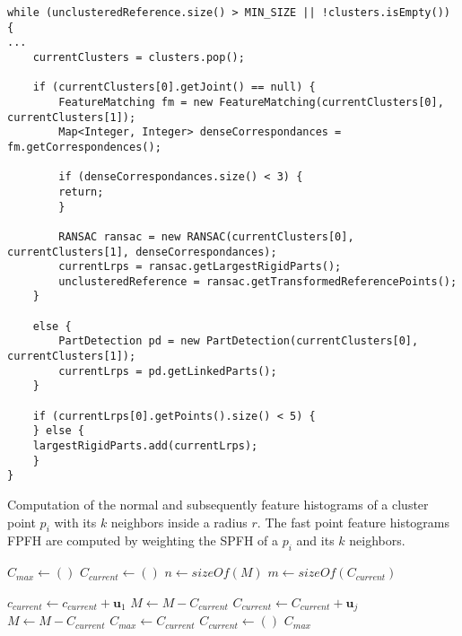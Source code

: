 \begin{lstlisting}
while (unclusteredReference.size() > MIN_SIZE || !clusters.isEmpty()) {
...
	currentClusters = clusters.pop();

	if (currentClusters[0].getJoint() == null) {
		FeatureMatching fm = new FeatureMatching(currentClusters[0], currentClusters[1]);
		Map<Integer, Integer> denseCorrespondances = fm.getCorrespondences();

		if (denseCorrespondances.size() < 3) {
		return;
		}

		RANSAC ransac = new RANSAC(currentClusters[0], currentClusters[1], denseCorrespondances);
		currentLrps = ransac.getLargestRigidParts();
		unclusteredReference = ransac.getTransformedReferencePoints();
	}

	else {
		PartDetection pd = new PartDetection(currentClusters[0], currentClusters[1]);
		currentLrps = pd.getLinkedParts();
	}

	if (currentLrps[0].getPoints().size() < 5) {
	} else {
	largestRigidParts.add(currentLrps);
	}
}
\end{lstlisting}
\begin{algorithm}[tbp]
	\caption{Computation of the normal and subsequently feature histograms of a cluster point $p_i$ with its $k$ neighbors inside a radius $r$. The fast point feature histograms FPFH are computed by weighting the SPFH of a $p_i$ and its $k$ neighbors.}
	
	\begin{algorithmic}[1]     %
		\label{alg:segmentation}
		
		\State $\mathit{C_{max}} \gets ()$
		\State $\mathit{C_{current}} \gets ()$
		\State $n \gets \mathit{sizeOf}(M)$
		\State $m \gets \mathit{sizeOf}(C_{current})$
		
		\State $\mathit{c_{current}} \gets \mathit{c_{current}} + \boldsymbol{u}_1$
		\State $M \gets M - C_{current}$
		\State $C_{current} \gets C_{current} + \boldsymbol{u}_j$
		\EndIf
		\EndFor
		\EndFor
		\State $M \gets M - C_{current}$
		\State $C_{max} \gets C_{current}$
		\EndIf
		\State $C_{current} \gets ()$
		\EndWhile
		\State\Return $C_{max}$
		\EndProcedure	
	\end{algorithmic}
\end{algorithm}

